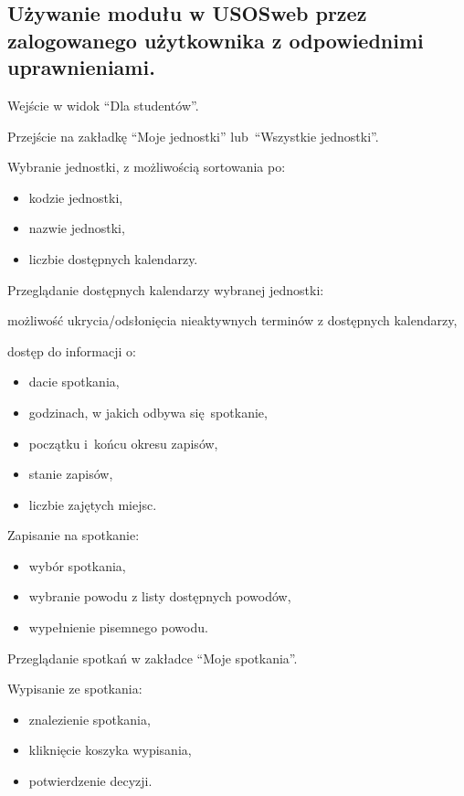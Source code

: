 \documentclass[licencjacka]{pracamgr}
\begin{document}
\subsection{Używanie modułu w USOSweb przez zalogowanego użytkownika z odpowiednimi uprawnieniami.}
	\begin{step}
			\item Wejście w widok \enquote{Dla studentów}.
			\item Przejście na zakładkę \enquote{Moje jednostki} lub~\enquote{Wszystkie jednostki}.
			\item Wybranie jednostki, z możliwością sortowania po:
				\begin{itemize}
					\item kodzie jednostki,
					\item nazwie jednostki,
					\item liczbie dostępnych kalendarzy. 
				\end{itemize}
			\item Przeglądanie dostępnych kalendarzy wybranej jednostki:
				\begin{step}
					\item możliwość ukrycia/odsłonięcia nieaktywnych terminów z dostępnych kalendarzy,
					\item dostęp do informacji o:
						\begin{itemize}
							\item dacie spotkania,
							\item godzinach, w jakich odbywa się~spotkanie,
							\item początku i~końcu okresu zapisów,
							\item stanie zapisów,
							\item liczbie zajętych miejsc.
						\end{itemize}
				\end{step}
			\item Zapisanie na spotkanie:
				\begin{itemize}
					\item wybór spotkania,
					\item wybranie powodu z listy dostępnych powodów,
					\item wypełnienie pisemnego powodu.
				\end{itemize}
			\item Przeglądanie spotkań w zakładce \enquote{Moje spotkania}.
				
			\item Wypisanie ze spotkania:
				\begin{itemize}
					\item znalezienie spotkania,
					\item kliknięcie koszyka wypisania,
					\item potwierdzenie decyzji.
				\end{itemize}
	\end{step}
	
\end{document}
